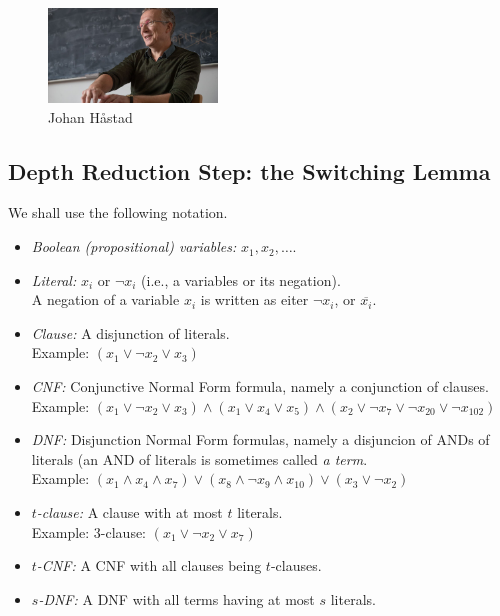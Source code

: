

\begin{figure}
    \centering
    \includegraphics[width=0.4\textwidth]{images/hastad-sitter-600.jpg}
    \caption{Johan H\aa stad}
\end{figure}


\subsection{Depth Reduction Step: the Switching Lemma}

We shall use the following notation.
\begin{itemize}
    \item \textit{Boolean (propositional) variables:} \(x_1, x_2, \ldots \).
    \item \textit{Literal:} \(x_i\) or \(\neg x_i\) (i.e., a variables or its negation).\\
    A negation of a variable  \(x_i\) is written as eiter \(\neg x_i\), or $\overline {x_i}$.
    \item \textit{Clause:} A disjunction of literals.\\
    Example: \((x_1 \lor \neg x_2 \lor x_3)\)
    \item \textit{CNF:} Conjunctive Normal Form formula, namely a conjunction  of clauses.\\
    Example: \((x_1 \lor \neg x_2 \lor x_3) \land (x_1 \lor x_4 \lor x_5) \land (x_2 \lor \neg x_7 \lor \neg x_{20} \lor \neg x_{102})\)
    \item \textit{DNF:} Disjunction Normal Form formulas, namely a disjuncion of ANDs of literals (an AND of literals is sometimes called \emph{a term}.\\
    Example: \((x_1 \land x_4 \land x_7) \lor (x_8 \land \neg x_9 \land x_{10}) \lor (x_3 \lor \neg x_2)\)
    \item \textit{$t$-clause:} A clause with at most \(t\) literals.\\
    Example: 3-clause: \((x_1 \lor \neg x_2 \lor x_7)\)
    \item \textit{$t$-CNF:} A CNF with all clauses being \(t\)-clauses.
    \item \textit{$s$-DNF:} A DNF with all terms  having at most \(s\) literals.
\end{itemize}


